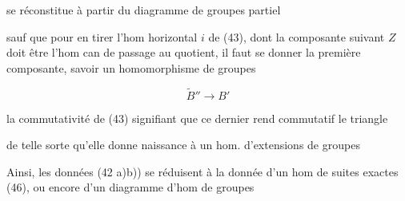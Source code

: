 
 se réconstitue à partir du diagramme de groupes partiel


sauf que pour en tirer l'hom horizontal $i$ de (43), dont la composante suivant $Z$ doit être l'hom can de passage au quotient, il faut se donner la première composante, savoir un homomorphisme de groupes

\[ \widetilde B''\longrightarrow B' \]

la commutativité de (43) signifiant que ce dernier rend commutatif le triangle


de telle sorte qu'elle donne  naissance à un hom. d'extensions de groupes


Ainsi, les données (42 a)b)) se réduisent à la donnée d'un hom de suites exactes (46), ou encore d'un diagramme d'hom de groupes


